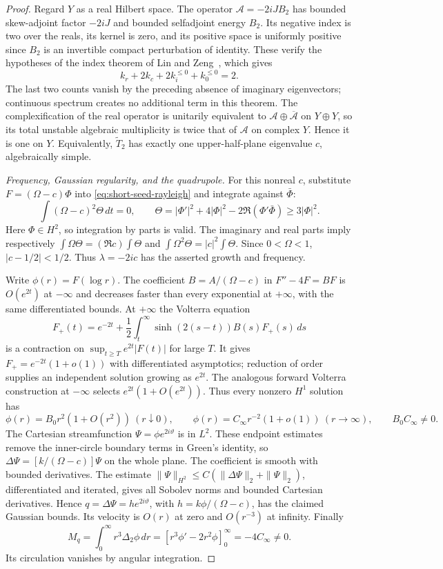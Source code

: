 \begin{proof}
Regard $Y$ as a real Hilbert space. The operator
$\mathcal A=-2iJB_2$ has bounded skew-adjoint factor $-2iJ$
and bounded selfadjoint energy $B_2$. Its negative index is two
over the reals, its kernel is zero, and its positive space is
uniformly positive since $B_2$ is an invertible compact perturbation
of identity. These verify the hypotheses of the index theorem of Lin and
Zeng~\cite{lin-zeng2021}, which gives
\[
 k_r+2k_c+2k_i^{\le0}+k_0^{\le0}=2.
\]
The last two counts vanish by the preceding absence of imaginary
eigenvectors; continuous spectrum creates no additional term in this
theorem. The complexification of the real operator is unitarily
equivalent to $\mathcal A\oplus\overline{\mathcal A}$ on $Y\oplus Y$,
so its total unstable algebraic multiplicity is twice that of
$\mathcal A$ on complex $Y$. Hence it is one on $Y$.
Equivalently, $\widetilde T_2$ has exactly one upper-half-plane
eigenvalue $c$, algebraically simple.

\emph{Frequency, Gaussian regularity, and the quadrupole.}
For this nonreal $c$, substitute $F=(\Omega-c)\Phi$ into
\eqref{eq:short-seed-rayleigh} and integrate against $\bar\Phi$:
\[
 \int(\Omega-c)^2\Theta\,dt=0,\qquad
 \Theta=|\Phi'|^2+4|\Phi|^2-2\Re(\Phi'\bar\Phi)
          \ge3|\Phi|^2.
\]
Here $\Phi\in H^2$, so integration by parts is valid.
The imaginary and real parts imply respectively
$\int\Omega\Theta=(\Re c)\int\Theta$ and
$\int\Omega^2\Theta=|c|^2\int\Theta$.
Since $0<\Omega<1$, $|c-1/2|<1/2$. Thus
$\lambda=-2ic$ has the asserted growth and frequency.

Write $\phi(r)=F(\log r)$. The coefficient
$B=A/(\Omega-c)$ in $F''-4F=BF$ is $O(e^{2t})$ at $-\infty$
and decreases faster than every exponential at $+\infty$, with
the same differentiated bounds. At $+\infty$ the Volterra equation
\[
 F_+(t)=e^{-2t}+\frac12\int_t^\infty
                   \sinh(2(s-t))B(s)F_+(s)\,ds
\]
is a contraction on $\sup_{t\ge T}e^{2t}|F(t)|$ for large $T$.
It gives $F_+=e^{-2t}(1+o(1))$ with differentiated asymptotics;
reduction of order supplies an independent solution growing as
$e^{2t}$. The analogous forward Volterra construction at $-\infty$
selects $e^{2t}(1+O(e^{2t}))$. Thus every nonzero $H^1$ solution has
\[
 \phi(r)=B_0r^2(1+O(r^2))\ (r\downarrow0),\qquad
 \phi(r)=C_\infty r^{-2}(1+o(1))\ (r\to\infty),
 \qquad B_0C_\infty\ne0.
\]
The Cartesian streamfunction $\Psi=\phi e^{2i\vartheta}$ is in $L^2$.
These endpoint estimates remove the inner-circle boundary terms in
Green's identity, so
$\Delta\Psi=[k/(\Omega-c)]\Psi$ on the whole plane.
The coefficient is smooth with bounded derivatives. The estimate
$\|\Psi\|_{H^2}\le C(\|\Delta\Psi\|_2+\|\Psi\|_2)$,
differentiated and iterated, gives all Sobolev norms and bounded
Cartesian derivatives. Hence
$q=\Delta\Psi=h e^{2i\vartheta}$, with
$h=k\phi/(\Omega-c)$, has the claimed Gaussian bounds.
Its velocity is $O(r)$ at zero and $O(r^{-3})$ at infinity.
Finally
\begin{equation}\label{eq:short-seed-quadrupole}
 M_q=\int_0^\infty r^3\Delta_2\phi\,dr
       =[r^3\phi'-2r^2\phi]_0^\infty=-4C_\infty\ne0.
\end{equation}
Its circulation vanishes by angular integration.


\end{proof}
